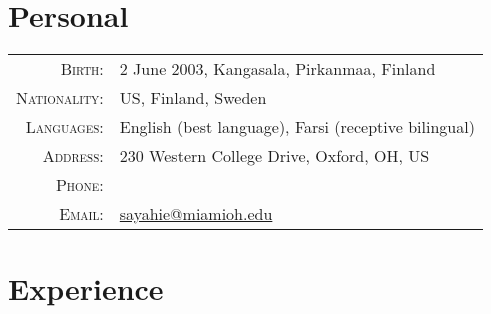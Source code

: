 \documentclass[a4paper,10pt]{article} %
\begin{document}
\pagestyle{empty} %


\par{\bigskip\par} %

\section{Personal}

\footnotesize{\begin{tabular}{rl}
\textsc{Birth:} & 2 June 2003, Kangasala, Pirkanmaa, Finland \\
\textsc{Nationality:} & US, Finland, Sweden \\
\textsc{Languages:} & English (best language), Farsi (receptive bilingual)\\
\textsc{Address:} & 230 Western College Drive, Oxford, OH, US \\
\textsc{Phone:} & \href{tel:+1-513-484-0972}{\color{black}{+1 (513) 484-0972}}\\
\textsc{Email:} & \href{mailto:sayahie@miamioh.edu}{sayahie@miamioh.edu}\\
\end{tabular}}\normalsize


\section{Experience}
\end{document}
